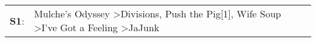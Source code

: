 \begin{supertabular}{p{0.03\textwidth}p{0.92\textwidth}}
 \textbf{S1}:  &  Mulche's Odyssey\textsuperscript{} \textgreater \enspace Divisions\textsuperscript{}, \enspace Push the Pig[1]\textsuperscript{}, \enspace Wife Soup\textsuperscript{} \textgreater \enspace I've Got a Feeling\textsuperscript{} \textgreater \enspace JaJunk\textsuperscript{}  \enspace  \\
\end{supertabular}
